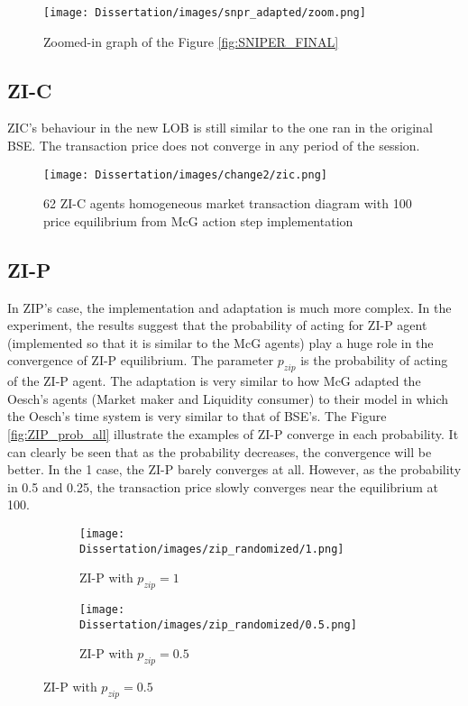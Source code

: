 \begin{figure}[h]
\texttt{[image: Dissertation/images/snpr\_adapted/zoom.png]}
\caption{Zoomed-in graph of the Figure \ref{fig:SNIPER_FINAL}} 
\end{figure} 
\FloatBarrier

\subsection{ZI-C}
ZIC's behaviour in the new LOB is still similar to the one ran in the original BSE. The transaction price does not converge in any period of the session.

\begin{figure}[h]
\texttt{[image: Dissertation/images/change2/zic.png]}
\caption{62 ZI-C agents homogeneous market transaction diagram with 100 price equilibrium from McG action step implementation}  
\end{figure} 
\FloatBarrier

\subsection{ZI-P}
In ZIP's case, the implementation and adaptation is much more complex. In the experiment, the results suggest that the probability of acting for ZI-P agent (implemented so that it is similar to the McG agents) play a huge role in the convergence of ZI-P equilibrium. The parameter $p_{zip}$ is the probability of acting of the ZI-P agent. The adaptation is very similar to how McG adapted the Oesch's agents (Market maker and Liquidity consumer) to their model in which the Oesch's \cite{Oesch} time system is very similar to that of BSE's. The Figure \ref{fig:ZIP_prob_all} illustrate the examples of ZI-P converge in each probability. It can clearly be seen that as the probability decreases, the convergence will be better. In the 1 case, the ZI-P barely converges at all. However, as the probability in 0.5 and 0.25, the transaction price slowly converges near the equilibrium at 100. 

\begin{figure}[h]
  \begin{subfigure}[b]{0.5\textwidth}
    \texttt{[image: Dissertation/images/zip\_randomized/1.png]}
    \caption{ZI-P with $p_{zip} = 1$ }
    \label{fig:1}
  \end{subfigure}
  \begin{subfigure}[b]{0.5\textwidth}
    \texttt{[image: Dissertation/images/zip\_randomized/0.5.png]}
    \caption{ZI-P with $p_{zip} = 0.5$}
    \label{fig:2}
  \end{subfigure}
\end{figure}


